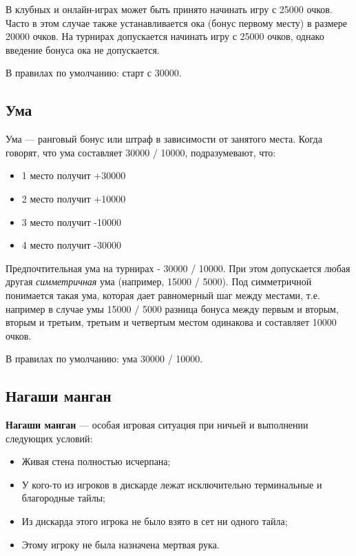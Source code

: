 В клубных и онлайн-играх может быть принято начинать игру с 25000 очков. Часто в этом случае также устанавливается ока (бонус первому месту) в размере 20000 очков. На турнирах допускается начинать игру с 25000 очков, однако введение бонуса ока не допускается.

В правилах по умолчанию: старт с 30000.

\subsection{Ума}

Ума --- ранговый бонус или штраф в зависимости от занятого места. Когда говорят, что ума составляет 30000 / 10000, подразумевают, что:

\begin{itemize}
    \item 1 место получит +30000
    \item 2 место получит +10000
    \item 3 место получит -10000
    \item 4 место получит -30000
\end{itemize}

Предпочтительная ума на турнирах - 30000 / 10000. При этом допускается любая другая \textit{симметричная} ума (например, 15000 / 5000). Под симметричной понимается такая ума, которая дает равномерный шаг между местами, т.е. например в случае умы 15000 / 5000 разница бонуса между первым и вторым, вторым и третьим, третьим и четвертым местом одинакова и составляет 10000 очков.

В правилах по умолчанию: ума 30000 / 10000.

\subsection{Нагаши манган}

\textbf{Нагаши манган} --- особая игровая ситуация при ничьей и выполнении следующих условий:

\begin{itemize}
	\item Живая стена полностью исчерпана;
	\item У кого-то из игроков в дискарде лежат исключительно терминальные и благородные тайлы;
	\item Из дискарда этого игрока не было взято в сет ни одного тайла;
	\item Этому игроку не была назначена мертвая рука.
\end{itemize}

